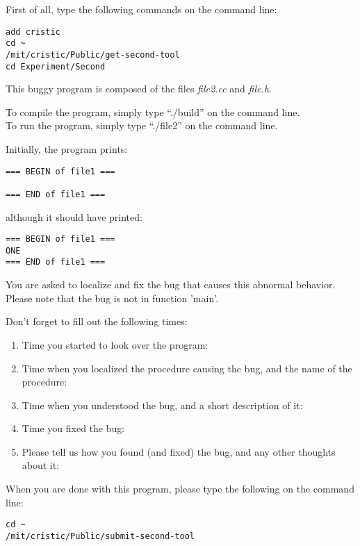\documentclass{article}
\title{}
\author{Bug 2 - Tool}
\date{July 30, 2003}
\begin{document}
\maketitle
\begin{flushleft}
\vspace{0.5in}

\thispagestyle{empty}

First of all, type the following commands on the command line:
\begin{verbatim}
add cristic
cd ~
/mit/cristic/Public/get-second-tool
cd Experiment/Second
\end{verbatim}


\vspace{0.1in}
This buggy program is composed of the files {\it file2.cc} and 
{\it file.h}. 

\vspace{0.1in}
To compile the program, simply type ``./build'' on the command line.\\
To run the program, simply type ``./file2'' on the command line.


\vspace{0.1in}
Initially, the program prints:

\begin{verbatim}
=== BEGIN of file1 ===

=== END of file1 ===
\end{verbatim}

although it should have printed:
\begin{verbatim}
=== BEGIN of file1 ===
ONE
=== END of file1 ===
\end{verbatim}

You are asked to localize and fix the bug that causes this abnormal behavior.
Please note that the bug is not in function 'main'.


\vspace{0.3in}
Don't forget to fill out the following times:
\begin{enumerate}
\item{Time you started to look over the program:}
\item{Time when you localized the procedure causing the bug, and the name
      of the procedure:\vspace{0.2in}}
\item{Time when you understood the bug, and a short description of it:\vspace{0.4in}}

\item{Time you fixed the bug:}

\item{Please tell us how you found (and fixed) the bug, and any other thoughts 
about it:}

\end{enumerate}

\vspace{0.45in}
When you are done with this program, please type the following on the 
command line:
\begin{verbatim}
cd ~
/mit/cristic/Public/submit-second-tool
\end{verbatim}


\end{flushleft}
\end{document}
